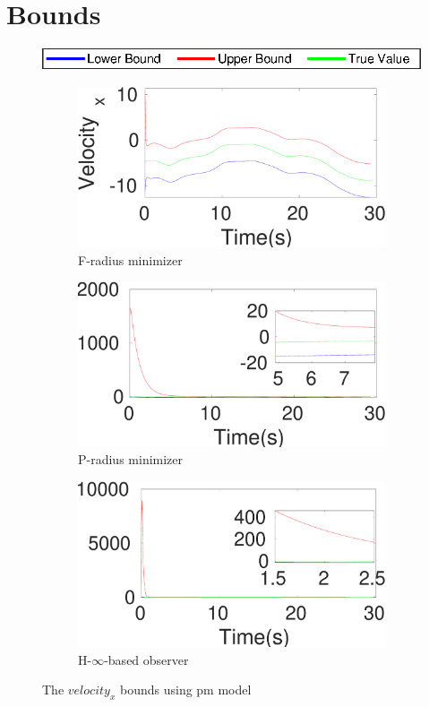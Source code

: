 \section{Bounds}
\begin{figure}[h]
\centering \includegraphics[scale=0.8]{figures/legend}\\
\begin{subfigure}{0.32\textwidth}
\centering
\includegraphics[width=\linewidth]{figures/sm}\caption{F-radius minimizer}
\end{subfigure}
\begin{subfigure}{0.32\linewidth}
\centering
\includegraphics[width=\linewidth]{figures/prad}\caption{P-radius minimizer}
\end{subfigure}
\begin{subfigure}{0.32\linewidth}
\centering
\includegraphics[width=\linewidth]{figures/hinf}\caption{H-$\infty$-based observer}
\end{subfigure}
\caption{The $velocity_x$ bounds using pm model}
\label{fig:bound}
\end{figure}
